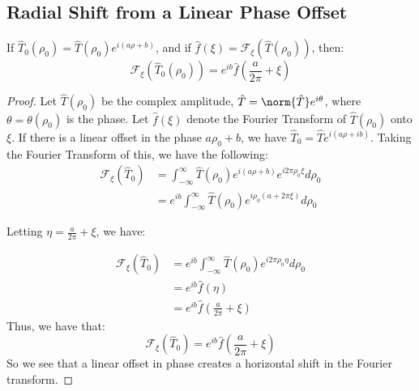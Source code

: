         \subsection{Radial Shift from a Linear Phase Offset}
            \begin{theorem}
                If $\hat{T}_0(\rho_0)=\hat{T}(\rho_0)e^{i(a\rho+b)}$,
                and if
                $\hat{f}(\xi)=\mathcal{F}_{\xi}(\hat{T}(\rho_0))$,
                then:
                \begin{equation}
                    \mathcal{F}_{\xi}(\hat{T}_{0}(\rho_0))
                    =e^{ib}\hat{f}(\frac{a}{2\pi}+\xi)
                \end{equation}
            \end{theorem}
            \begin{proof}
                Let $\hat{T}(\rho_0)$ be the complex amplitude,
                $\hat{T}=\norm{\hat{T}}e^{i\theta}$, where
                $\theta=\theta(\rho_0)$ is the phase. Let
                $\hat{f}(\xi)$ denote the Fourier Transform
                of $\hat{T}(\rho_0)$ onto $\xi$. If there is a
                linear offset in the phase $a\rho_0+b$, we have
                $\hat{T}_{0}=\hat{T}e^{i(a\rho+ib)}$. Taking the
                Fourier Transform of this, we have the following:
            \begin{align*}
                \mathcal{F}_{\xi}(\hat{T}_{0})
                &=\int_{-\infty}^{\infty}\hat{T}(\rho_0)
                e^{i(a\rho+b)}e^{i2\pi \rho_0 \xi}d\rho_0\\
            &=e^{ib} \int_{-\infty}^{\infty} \hat{T}(\rho_0)e^{i\rho_0(a+2\pi \xi)}d\rho_0
            \end{align*}
            
            Letting $\eta = \frac{a}{2\pi}+\xi$, we have:
            
            \begin{align*}
            \nonumber \mathcal{F}_{\xi} (\hat{T}_{0}) &= e^{ib}\int_{-\infty}^{\infty}\hat{T}(\rho_0)e^{i2\pi\rho_{0}\eta}d\rho_0 \\
            \nonumber &= e^{ib}\hat{f}(\eta)\\
            		 &= e^{ib}\hat{f}(\frac{a}{2\pi}+\xi)
            \end{align*}
            Thus, we have that:
            \begin{equation*}
            \mathcal{F}_{\xi} (\hat{T}_{0}) = e^{ib}\hat{f}(\frac{a}{2\pi}+\xi)
            \end{equation*}
            So we see that a linear offset in phase creates a horizontal shift in the Fourier transform.
            \end{proof}
